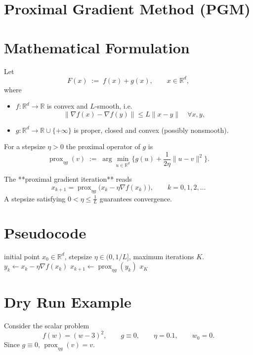 \documentclass{article}
\begin{document}
\section*{Proximal Gradient Method (PGM)}

\section*{Mathematical Formulation}
Let 
\[
F(x)\;:=\;f(x)+g(x),\qquad x\in\mathbb{R}^{d},
\]
where  

\begin{itemize}
  \item $f:\mathbb{R}^{d}\rightarrow\mathbb{R}$ is convex and $L$‑smooth, i.e.
    \[
    \|\nabla f(x)-\nabla f(y)\|\le L\|x-y\|\quad\forall x,y,
    \]
  \item $g:\mathbb{R}^{d}\rightarrow\mathbb{R}\cup\{+\infty\}$ is proper, closed and convex (possibly nonsmooth).
\end{itemize}
For a stepsize $\eta>0$ the proximal operator of $g$ is
\[
\operatorname{prox}_{\eta g}(v)\;:=\;\arg\min_{u\in\mathbb{R}^{d}}
\Big\{ g(u)+\frac{1}{2\eta}\|u-v\|^{2}\Big\}.
\]

The **proximal gradient iteration** reads
\begin{equation}
\boxed{
x_{k+1}= \operatorname{prox}_{\eta g}\!\bigl(x_{k}-\eta \nabla f(x_{k})\bigr)},
\qquad k=0,1,2,\dots
\label{eq:pgm}
\end{equation}
A stepsize satisfying $0<\eta\le \frac{1}{L}$ guarantees convergence.

\section*{Pseudocode}
\begin{algorithm}[H]
\caption{Proximal Gradient Method}
\begin{algorithmic}[1]
\REQUIRE initial point $x_{0}\in\mathbb{R}^{d}$, stepsize $\eta\in(0,1/L]$,
         maximum iterations $K$.
    \STATE $y_{k}\gets x_{k}-\eta\nabla f(x_{k})$ \hfill{}
    \STATE $x_{k+1}\gets \operatorname{prox}_{\eta g}(y_{k})$ \hfill{}
\ENDFOR
\RETURN $x_{K}$
\end{algorithmic}
\end{algorithm}

\section*{Dry Run Example}
Consider the scalar problem
\[
f(w)=(w-3)^{2},\qquad g\equiv0,\qquad \eta=0.1,\qquad w_{0}=0.
\]
Since $g\equiv0$, $\operatorname{prox}_{\eta g}(v)=v$.
\end{document}
